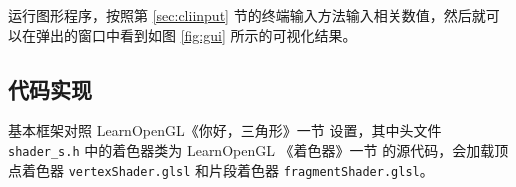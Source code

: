 \documentclass[math-font=newcm]{sjtuarticle}
\providecommand{\code}[2]{}
\begin{document}
运行图形程序，按照第 \ref{sec:cliinput} 节的终端输入方法输入相关数值，然后就可以在弹出的窗口中看到如图 \ref{fig:gui} 所示的可视化结果。


\subsection{代码实现}

基本框架对照 LearnOpenGL《你好，三角形》一节\cite{hellotri} 设置，其中头文件 \verb"shader_s.h" 中的着色器类为 LearnOpenGL 《着色器》一节\cite{shaders} 的源代码\cite{shadersrc}，会加载顶点着色器 \verb"vertexShader.glsl" 和片段着色器 \verb"fragmentShader.glsl"。

\code{../source/src/main.cpp}{c++}

\code{../source/assets/shader/vertexShader.glsl}{c}

\code{../source/assets/shader/fragmentShader.glsl}{c}

\printbibliography[heading=bibintoc]

\appendix



\end{document}
